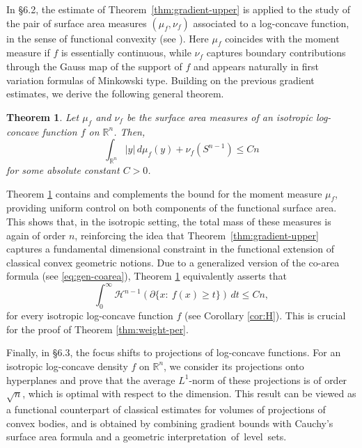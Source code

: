 \documentclass[11pt,leqno]{article}
\newtheorem{theorem}{Theorem}[section]
\theoremstyle{definition}
\theoremstyle{remark}
\numberwithin{equation}{section}
\newcommand{\ls}{\leqslant}
\newcommand{\gr}{\geqslant}
\newcommand{\1}{\textbf{1}}
\begin{document}
In \S 6.2, the estimate of Theorem~\ref{thm:gradient-upper} is applied to the study of the pair of surface area measures $(\mu_f,\nu_f)$ associated to a log-concave function, 
in the sense of functional convexity (see \cite{Rotem-2022, Rotem-2023}).  Here $\mu_f$ coincides with the moment measure if $f$ is essentially continuous, while $\nu_f$ captures boundary contributions through the Gauss map of the support of $f$ and appears naturally in first variation formulas of Minkowski type. Building on the previous gradient estimates, we derive  the following general theorem.


\begin{theorem}\label{th:nu-f}Let $\mu_{f}$ and $\nu_{f}$ be the surface area measures of an isotropic log-concave function $f$ on $\mathbb{R}^n$.
Then,
$$\int_{\mathbb{R}^n} |y| \, d\mu_f(y)+\nu_f(S^{n-1})\ls Cn$$
for some absolute constant $C>0$.
\end{theorem}

Theorem \ref{th:nu-f} contains and complements the bound for the moment measure $\mu_f$, providing uniform control on both components of the functional surface area.
This shows that, in the isotropic setting, the total mass of these measures is again of order $n$, reinforcing the idea that 
Theorem~\ref{thm:gradient-upper} captures a fundamental dimensional constraint in the functional extension of classical convex geometric notions. Due to a generalized version of the co-area formula (see \eqref{eq:gen-coarea}), Theorem \ref{th:nu-f} equivalently asserts that 
\begin{equation*}
\int_0^\infty \mathcal{H}^{n-1}(\partial \{x: \ f(x)\gr t\}) \, dt \ls Cn, 
\end{equation*}
for every isotropic log-concave function $f$ (see Corollary \ref{cor:H}). This is crucial for the proof of Theorem \ref{thm:weight-per}.


Finally, in \S 6.3, the focus shifts to projections of log-concave functions. For an isotropic log-concave density $f$ on $\mathbb{R}^n$, we consider its projections onto 
hyperplanes and prove that the average $L^1$-norm of these projections is of order $\sqrt{n}$, which is optimal with respect to the dimension. 
This result can be viewed as a functional counterpart of classical estimates for volumes of projections of convex bodies, and is obtained by combining gradient bounds with Cauchy’s surface area formula and a geometric \mbox{interpretation of level sets.}

\medskip
\end{document}

